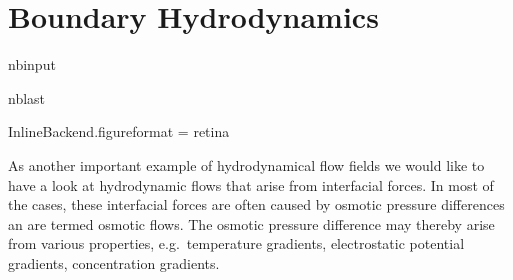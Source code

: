 \documentclass[letterpaper,10pt,english]{sphinxmanual}
\begin{document}
\chapter{Boundary Hydrodynamics}
\label{\detokenize{notebooks/L18/2_boundary_hydrodynamics:Boundary-Hydrodynamics}}\label{\detokenize{notebooks/L18/2_boundary_hydrodynamics::doc}}
\begin{sphinxuseclass}{nbinput}
\begin{sphinxuseclass}{nblast}
{
\begin{sphinxVerbatim}[commandchars=\\\{\}]
\llap{\color{nbsphinxin}[9]:\,\hspace{\fboxrule}\hspace{\fboxsep}}   
   
   
   
 

 InlineBackend.figure\PYGZus{}format = \PYGZsq{}retina\PYGZsq{}

    
      

\end{sphinxVerbatim}
}

\end{sphinxuseclass}
\end{sphinxuseclass}
\sphinxAtStartPar
As another important example of hydrodynamical flow fields we would like to have a look at hydrodynamic flows that arise from interfacial forces. In most of the cases, these interfacial forces are often caused by osmotic pressure differences an are termed osmotic flows. The osmotic pressure difference may thereby arise from various properties, e.g. temperature gradients, electrostatic potential gradients, concentration gradients.
\end{document}
